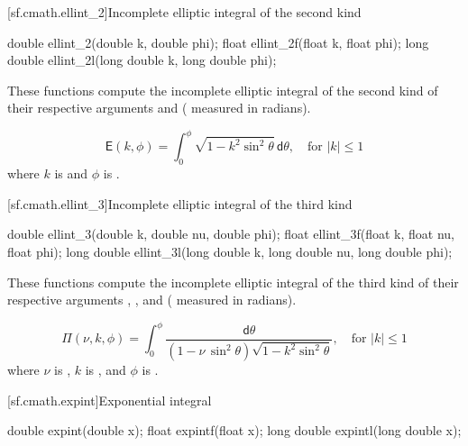 [sf.cmath.ellint_2]{Incomplete elliptic integral of the second kind}%
%
%
%
%
%
\begin{itemdecl}
double       ellint_2(double k, double phi);
float        ellint_2f(float k, float phi);
long double  ellint_2l(long double k, long double phi);
\end{itemdecl}

\begin{itemdescr}

\pnum\effects
These functions compute
the incomplete elliptic integral of the second kind
of their respective arguments
 and  ( measured in radians).

\pnum\returns
\[%
  \mathsf{E}(k, \phi) =
  \int_0^\phi \! \sqrt{1 - k^2 \sin^2 \theta} \, \mathsf{d}\theta,
	   \quad \mbox{for $|k| \le 1$}
\]
where
$k$ is  and
$\phi$ is .
\end{itemdescr}

[sf.cmath.ellint_3]{Incomplete elliptic integral of the third kind}%
%
%
%
%
%
\begin{itemdecl}
double       ellint_3(double k, double nu, double phi);
float        ellint_3f(float k, float nu, float phi);
long double  ellint_3l(long double k, long double nu, long double phi);
\end{itemdecl}

\begin{itemdescr}

\pnum\effects
These functions compute
the incomplete elliptic integral of the third kind
of their respective arguments
, , and  ( measured in radians).

\pnum\returns
\[%
  \mathsf{\Pi}(\nu, k, \phi) =
  \int_0^\phi \! \frac{ \mathsf{d}\theta }
                      { (1 - \nu \, \sin^2 \theta) \sqrt{1 - k^2 \sin^2 \theta} },
	   \quad \mbox{for $|k| \le 1$}
\]
where
$\nu$ is ,
$k$ is , and
$\phi$ is .
\end{itemdescr}

[sf.cmath.expint]{Exponential integral}%
%
%
%
%
%
\begin{itemdecl}
double       expint(double x);
float        expintf(float x);
long double  expintl(long double x);
\end{itemdecl}

